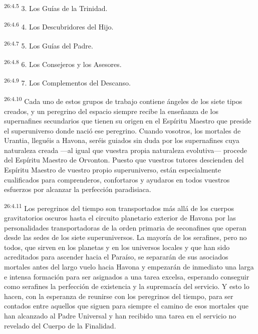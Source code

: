 \par
\textsuperscript{26:4.5} 3. Los Guías de la Trinidad.

\par
\textsuperscript{26:4.6} 4. Los Descubridores del Hijo.

\par
\textsuperscript{26:4.7} 5. Los Guías del Padre.

\par
\textsuperscript{26:4.8} 6. Los Consejeros y los Asesores.

\par
\textsuperscript{26:4.9} 7. Los Complementos del Descanso.

\par
\textsuperscript{26:4.10} Cada uno de estos grupos de trabajo contiene ángeles de los siete tipos creados, y un peregrino del espacio siempre recibe la enseñanza de los supernafines secundarios que tienen su origen en el Espíritu Maestro que preside el superuniverso donde nació ese peregrino. Cuando vosotros, los mortales de Urantia, lleguéis a Havona, seréis guiados sin duda por los supernafines cuya naturaleza creada ---al igual que vuestra propia naturaleza evolutiva--- procede del Espíritu Maestro de Orvonton. Puesto que vuestros tutores descienden del Espíritu Maestro de vuestro propio superuniverso, están especialmente cualificados para comprenderos, confortaros y ayudaros en todos vuestros esfuerzos por alcanzar la perfección paradisiaca.

\par
\textsuperscript{26:4.11} Los peregrinos del tiempo son transportados más allá de los cuerpos gravitatorios oscuros hasta el circuito planetario exterior de Havona por las personalidades transportadoras de la orden primaria de seconafines que operan desde las sedes de los siete superuniversos. La mayoría de los serafines, pero no todos, que sirven en los planetas y en los universos locales y que han sido acreditados para ascender hacia el Paraíso, se separarán de sus asociados mortales antes del largo vuelo hacia Havona y empezarán de inmediato una larga e intensa formación para ser asignados a una tarea excelsa, esperando conseguir como serafines la perfección de existencia y la supremacía del servicio. Y esto lo hacen, con la esperanza de reunirse con los peregrinos del tiempo, para ser contados entre aquellos que siguen para siempre el camino de esos mortales que han alcanzado al Padre Universal y han recibido una tarea en el servicio no revelado del Cuerpo de la Finalidad.

